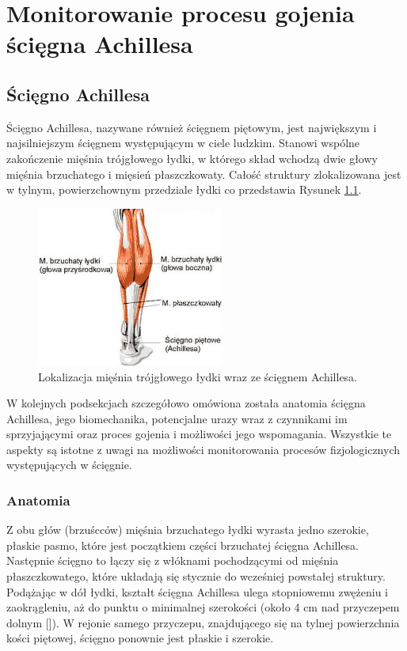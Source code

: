 \chapter{Monitorowanie procesu gojenia ścięgna Achillesa}
\section{Ścięgno Achillesa}
Ścięgno Achillesa, nazywane również ścięgnem piętowym, jest największym i najsilniejszym ścięgnem występującym w ciele ludzkim. Stanowi wspólne zakończenie mięśnia trójgłowego łydki, w którego skład wchodzą dwie głowy mięśnia brzuchatego i mięsień płaszczkowaty. Całość struktury zlokalizowana jest w tylnym, powierzchownym przedziale łydki co przedstawia Rysunek \ref{muscle_structure}.  
\begin{figure}[h!]
\centering
\includegraphics[width=0.55\textwidth]{figures/muscleStructure.jpg}
\caption{Lokalizacja mięśnia trójgłowego łydki wraz ze ścięgnem Achillesa.}
\label{muscle_structure}
\end{figure}

W kolejnych podsekcjach szczegółowo omówiona została anatomia ścięgna Achillesa, jego biomechanika, potencjalne urazy wraz z czynnikami im sprzyjającymi oraz proces gojenia i możliwości jego wspomagania. Wszystkie te aspekty są istotne z uwagi na możliwości monitorowania procesów fizjologicznych występujących w ścięgnie. 

\subsection{Anatomia}

Z obu głów (brzuścców) mięśnia brzuchatego łydki wyrasta jedno szerokie, płaskie pasmo, które jest początkiem części brzuchatej ścięgna Achillesa. Następnie ścięgno to łączy się z włóknami pochodzącymi od mięśnia płaszczkowatego, które układają się stycznie do wcześniej powstałej struktury. Podążając w dół łydki, kształt ścięgna Achillesa ulega stopniowemu zwężeniu i zaokrągleniu, aż do punktu o minimalnej szerokości (około 4 cm nad przyczepem dolnym []). W rejonie samego przyczepu, znajdującego się na tylnej powierzchnia kości piętowej, ścięgno ponownie jest płaskie i szerokie.

